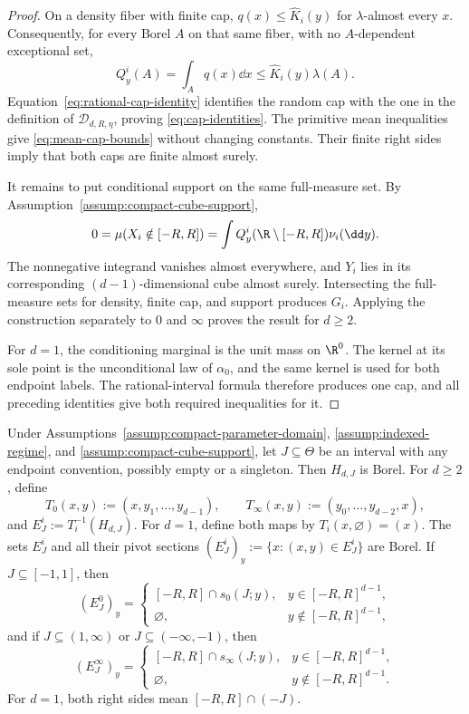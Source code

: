 \begin{proof}
On a density fiber with finite cap,
$q(x)\leq\widehat K_i(y)$ for $\lambda$-almost every $x$.  Consequently,
for every Borel $A$ on that same fiber, with no $A$-dependent exceptional
set,
\[
Q^i_y(A)=\int_Aq(x)\dd x
\leq\widehat K_i(y)\lambda(A).
\]
Equation~\eqref{eq:rational-cap-identity} identifies the random cap with the
one in the definition of $\mathcal D_{d,R,\eta}$, proving
\eqref{eq:cap-identities}.  The primitive mean inequalities give
\eqref{eq:mean-cap-bounds} without changing constants.  Their finite right
sides imply that both caps are finite almost surely.

It remains to put conditional support on the same full-measure set.  By
Assumption~\ref{assump:compact-cube-support},
\[
0=\mu(X_i\notin[-R,R])
=\int Q^i_y(\R\setminus[-R,R])\nu_i(\dd y).
\]
The nonnegative integrand vanishes almost everywhere, and $Y_i$ lies in its
corresponding $(d-1)$-dimensional cube almost surely.  Intersecting the
full-measure sets for density, finite cap, and support produces $G_i$.
Applying the construction separately to $0$ and $\infty$ proves the result
for $d\geq2$.

For $d=1$, the conditioning marginal is the unit mass on $\R^0$.  The kernel
at its sole point is the unconditional law of $\alpha_0$, and the same kernel
is used for both endpoint labels.  The rational-interval formula therefore
produces one cap, and all preceding identities give both required
inequalities for it.
\end{proof}

\begin{lemma}
\label{lem:borel-sections}
Under Assumptions~\ref{assump:compact-parameter-domain},
\ref{assump:indexed-regime}, and \ref{assump:compact-cube-support}, let
$J\subseteq\Theta$ be an interval with any endpoint convention, possibly
empty or a singleton.  Then $H_{d,J}$ is Borel.  For $d\geq2$, define
\[
T_0(x,y):=(x,y_1,\ldots,y_{d-1}),\qquad
T_\infty(x,y):=(y_0,\ldots,y_{d-2},x),
\]
and $E^i_J:=T_i^{-1}(H_{d,J})$.  For $d=1$, define both maps by
$T_i(x,\varnothing)=(x)$.  The sets $E^i_J$ and all their pivot sections
$(E^i_J)_y:=\{x:(x,y)\in E^i_J\}$ are Borel.  If $J\subseteq[-1,1]$, then
\begin{equation}
(E^0_J)_y=
\begin{cases}
[-R,R]\cap s_0(J;y),&y\in[-R,R]^{d-1},\\
\varnothing,&y\notin[-R,R]^{d-1},
\end{cases}
\label{eq:inner-section}
\end{equation}
and if $J\subseteq(1,\infty)$ or $J\subseteq(-\infty,-1)$, then
\begin{equation}
(E^\infty_J)_y=
\begin{cases}
[-R,R]\cap s_\infty(J;y),&y\in[-R,R]^{d-1},\\
\varnothing,&y\notin[-R,R]^{d-1}.
\end{cases}
\label{eq:outer-section}
\end{equation}
For $d=1$, both right sides mean $[-R,R]\cap(-J)$.
\end{lemma}

